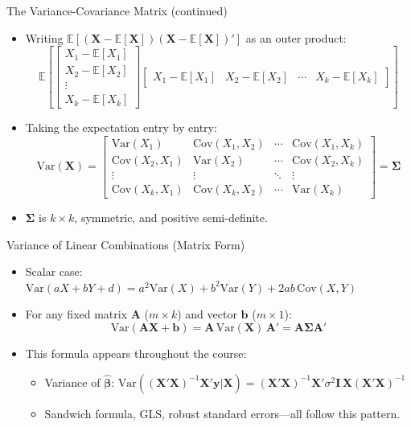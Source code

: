 \documentclass[aspectratio=169, handout, t]{beamer}
\numberwithin{equation}{section}
\begin{document}
\begin{frame}{The Variance-Covariance Matrix (continued)}
\begin{itemize}
\item Writing $\mathbb{E}[(\bm{X}-\mathbb{E}[\bm{X}])(\bm{X}-\mathbb{E}[\bm{X}])']$ as an outer product:\pause
$$\mathbb{E}[\begin{bmatrix} X_1-\mathbb{E}[X_1] \\ X_2-\mathbb{E}[X_2] \\ \vdots \\ X_k-\mathbb{E}[X_k] \end{bmatrix}\begin{bmatrix} X_1-\mathbb{E}[X_1] & X_2-\mathbb{E}[X_2] & \cdots & X_k-\mathbb{E}[X_k] \end{bmatrix}]$$\pause
\item Taking the expectation entry by entry:
$$\text{Var}(\bm{X})=\begin{bmatrix} \text{Var}(X_1) & \text{Cov}(X_1,X_2) & \cdots & \text{Cov}(X_1,X_k) \\ \text{Cov}(X_2,X_1) & \text{Var}(X_2) & \cdots & \text{Cov}(X_2,X_k) \\ \vdots & \vdots & \ddots & \vdots \\ \text{Cov}(X_k,X_1) & \text{Cov}(X_k,X_2) & \cdots & \text{Var}(X_k) \end{bmatrix}=\bm{\Sigma}$$\pause
\item $\bm{\Sigma}$ is $k\times k$, symmetric, and positive semi-definite.
\end{itemize}
\end{frame}


\begin{frame}{Variance of Linear Combinations (Matrix Form)}
\begin{itemize}
\item Scalar case: $\text{Var}(aX+bY+d)=a^2\text{Var}(X)+b^2\text{Var}(Y)+2ab\,\text{Cov}(X,Y)$\pause
\item For any fixed matrix $\bm{A}$ ($m\times k$) and vector $\bm{b}$ ($m \times 1$):
\[\text{Var}(\bm{A}\bm{X}+\bm{b})=\bm{A}\,\text{Var}(\bm{X})\,\bm{A}'=\bm{A}\bm{\Sigma}\bm{A}'\]\pause
\item This formula appears throughout the course:
\begin{itemize}
\item Variance of $\hat{\bm{\beta}}$: $\text{Var}((\bm{X}'\bm{X})^{-1}\bm{X}'\bm{y}|\bm{X})=(\bm{X}'\bm{X})^{-1}\bm{X}'\sigma^2\bm{I}\,\bm{X}(\bm{X}'\bm{X})^{-1}$
\item Sandwich formula, GLS, robust standard errors---all follow this pattern.
\end{itemize}
\end{itemize}
\end{frame}
\end{document}
